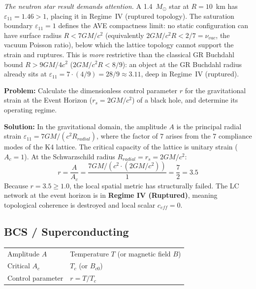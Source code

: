 \noindent \textit{The neutron star result demands attention.} A 1.4~$M_\odot$ star at $R = 10$~km has $\varepsilon_{11} = 1.46 > 1$, placing it in Regime~IV (ruptured topology). The saturation boundary $\varepsilon_{11} = 1$ defines the AVE compactness limit: no static configuration can have surface radius $R < 7GM/c^2$ (equivalently $2GM/c^2R < 2/7 = \nu_{vac}$, the vacuum Poisson ratio), below which the lattice topology cannot support the strain and ruptures. This is \emph{more} restrictive than the classical GR Buchdahl bound $R > 9GM/4c^2$ ($2GM/c^2R < 8/9$): an object at the GR Buchdahl radius already sits at $\varepsilon_{11} = 7\cdot(4/9) = 28/9 \approx 3.11$, deep in Regime~IV (ruptured).

\begin{examplebox}
\textbf{Problem:} Calculate the dimensionless control parameter $r$ for the gravitational strain at the Event Horizon ($r_s = 2GM/c^2$) of a black hole, and determine its operating regime.

\textbf{Solution:} In the gravitational domain, the amplitude $A$ is the principal radial strain $\varepsilon_{11} = 7GM/(c^2 R_{radial})$, where the factor of 7 arises from the 7 compliance modes of the K4 lattice. The critical capacity of the lattice is unitary strain ($A_c = 1$).
At the Schwarzschild radius $R_{radial} = r_s = 2GM/c^2$:
\[ r = \frac{A}{A_c} = \frac{7GM/(c^2 \cdot (2GM/c^2))}{1} = \frac{7}{2} = 3.5 \]
Because $r = 3.5 \ge 1.0$, the local spatial metric has structurally failed. The LC network at the event horizon is in \textbf{Regime IV (Ruptured)}, meaning topological coherence is destroyed and local scalar $c_{eff} = 0$.
\end{examplebox}

\subsection{BCS / Superconducting}

\begin{center}
\begin{tabular}{ll}
\toprule
Amplitude $A$ & Temperature $T$ (or magnetic field $B$) \\
Critical $A_c$ & $T_c$ (or $B_{c0}$) \\
Control parameter & $r = T/T_c$ \\
\bottomrule
\end{tabular}
\end{center}

